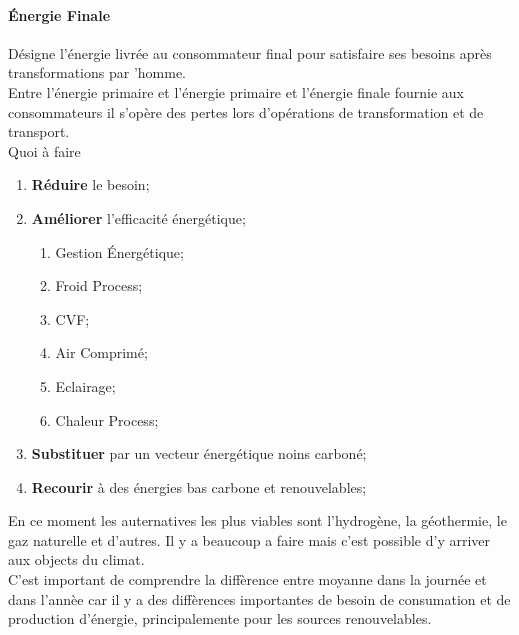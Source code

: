 \documentclass{article}
\begin{document}
\paragraph{Énergie Finale }Désigne l'énergie livrée au consommateur final pour satisfaire ses besoins après transformations par 'homme.\\

\noindent Entre l'énergie primaire et l'énergie primaire et l'énergie finale fournie aux consommateurs il s'opère des pertes lors d'opérations de transformation et de transport.\\

\noindent Quoi à faire
\begin{enumerate}
    \item \textbf{Réduire} le besoin;
    \item \textbf{Améliorer} l'efficacité énergétique;
    \begin{enumerate}[noitemsep]
        \item Gestion Énergétique;
        \item Froid Process;

        \item CVF;
        \item Air Comprimé;

        \item Eclairage;

        \item Chaleur Process;
    \end{enumerate}
    \item \textbf{Substituer} par un vecteur énergétique noins carboné;
    \item \textbf{Recourir} à des énergies bas carbone et renouvelables;
\end{enumerate}
En ce moment les auternatives les plus viables sont l'hydrogène, la géothermie, le gaz naturelle et d'autres. Il y a beaucoup a faire mais c'est possible d'y arriver aux objects du climat.\\

\noindent C'est important de comprendre la diffèrence entre moyanne dans la journée et dans l'annèe car il y a des diffèrences importantes de besoin de consumation et de production d'énergie, principalemente pour les sources renouvelables.
\end{document}
